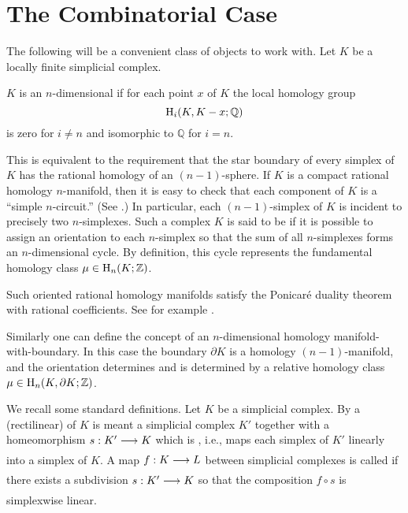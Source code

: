 \documentclass[../main]{subfiles}
\begin{document}
\section{The Combinatorial Case}
The following will be a convenient class of objects to work with. Let $K$ be a locally finite simplicial complex.

\begin{definition}
$K$ is an $n$-dimensional  if for each point $x$ of $K$ the local homology group \[\operatorname{H}_i(K,K-x;\mathbb{Q})\] is zero for $i \neq n$ and isomorphic to $\mathbb{Q}$ for $i = n$.
\end{definition}
This is equivalent to the requirement that the star boundary of every simplex of $K$ has the rational homology of an $(n-1)$-sphere. If $K$ is a compact rational homology $n$-manifold, then it is easy to check that each component of $K$ is a  ``simple $n$-circuit.'' (See \cite[p. 106]{eilenbergsteenrod1952}.) In particular, each $(n-1)$-simplex of $K$ is incident to precisely two $n$-simplexes. Such a complex $K$ is said to be  if it is possible to assign an orientation to each $n$-simplex so that the sum of all $n$-simplexes forms an $n$-dimensional cycle. By definition, this cycle represents the fundamental homology class $\mu \in \operatorname{H}_n(K;\mathbb{Z})$.

Such oriented rational homology manifolds satisfy the Ponicaré duality theorem with rational coefficients. See for example \cite{borel1960}.

Similarly one can define the concept of an $n$-dimensional homology manifold-with-boundary. In this case the boundary $\partial K$ is a homology $(n-1)$-manifold, and the orientation determines and is determined by a relative homology class $\mu \in \operatorname{H}_n(K,\partial K; \mathbb{Z})$. 

We recall some standard definitions. Let $K$ be a simplicial complex. By a (rectilinear)  of $K$ is meant a simplicial complex $K'$ together with a homeomorphism $s:K' \varrightarrow{} K$ which is , i.e., maps each simplex of $K'$ linearly into a simplex of $K$. A map $f:K \varrightarrow{} L$ between simplicial complexes is called  if there exists a subdivision $s:K'\varrightarrow{} K$ so that the composition $f \circ s$ is simplexwise linear.
\end{document}
